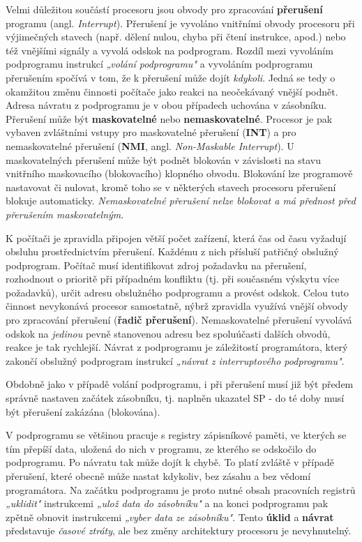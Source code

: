     
    Velmi důležitou součástí procesoru jsou obvody pro zpracování \textbf{přerušení} programu 
    (angl. \emph{Interrupt}). Přerušení je vyvoláno vnitřními obvody procesoru při výjimečných 
    stavech (např. dělení nulou, chyba při čtení instrukce, apod.) nebo též vnějšími signály a 
    vyvolá odskok na podprogram. Rozdíl mezi vyvoláním podprogramu instrukcí \emph{„volání 
    podprogramu"} a vyvoláním podprogramu přerušením spočívá v tom, že k přerušení může dojít 
    \emph{kdykoli}. Jedná se tedy o okamžitou změnu činnosti počítače jako reakci na neočekávaný 
    vnější podnět. Adresa návratu z podprogramu je v obou případech uchována v zásobníku. Přerušení 
    může být \textbf{maskovatelné} nebo \textbf{nemaskovatelné}. Procesor je pak vybaven zvláštními 
    vstupy pro maskovatelné přerušení (\textbf{INT}) a pro nemaskovatelné přerušení   
    (\textbf{NMI}, angl. \emph{Non-Maskable Interrupt}). U maskovatelných přerušení může být podnět 
    blokován v závislosti na stavu vnitřního maskovacího (blokovacího) klopného obvodu. Blokování 
    lze programově nastavovat či nulovat, kromě toho se v některých stavech procesoru přerušení 
    blokuje automaticky. \emph{Nemaskovatelné přerušení nelze blokovat a má přednost před 
    přerušením maskovatelným}.
    
    K počítači je zpravidla připojen větší počet zařízení, která čas od času vyžadují obsluhu 
    prostřednictvím přerušení. Každému z nich přísluší patřičný obslužný podprogram. Počítač musí 
    identifikovat zdroj požadavku na přerušení, rozhodnout o prioritě při případném konfliktu (tj. 
    při současném výskytu více požadavků), určit adresu obslužného podprogramu a provést odskok. 
    Celou tuto činnost nevykonává procesor samostatně, nýbrž zpravidla využívá vnější obvody pro 
    zpracování přerušení (\textbf{řadič přerušení}). Nemaskovatelné přerušení vyvolává odskok na 
    \emph{jedinou} pevně stanovenou adresu bez spoluúčasti dalších obvodů, reakce je tak rychlejší. 
    Návrat z podprogramu je záležitostí programátora, který zakončí obslužný podprogram instrukcí 
    \emph{„návrat z interruptového podprogramu"}.
    
    Obdobně jako v případě volání podprogramu, i při přerušení musí již být předem správně nastaven 
    začátek zásobníku, tj. naplněn ukazatel SP - do té doby musí být přerušení zakázána (blokována).
    
    V podprogramu se většinou pracuje s registry zápisníkové paměti, ve kterých se tím přepíší 
    data, uložená do nich v programu, ze kterého se odskočilo do podprogramu. Po návratu tak může 
    dojít k chybě. To platí zvláště v případě přerušení, které obecně může nastat kdykoliv, bez 
    zásahu a bez vědomí programátora. Na začátku podprogramu je proto nutné obsah pracovních 
    registrů \emph{„uklidit"} instrukcemi \emph{„ulož data do zásobníku"} a na konci podprogramu 
    pak zpětně obnovit instrukcemi \emph{„vyber data ze zásobníku"}. Tento \textbf{úklid} a 
    \textbf{návrat} představuje \emph{časové ztráty}, ale bez změny architektury procesoru je 
    nevyhnutelný.
    
